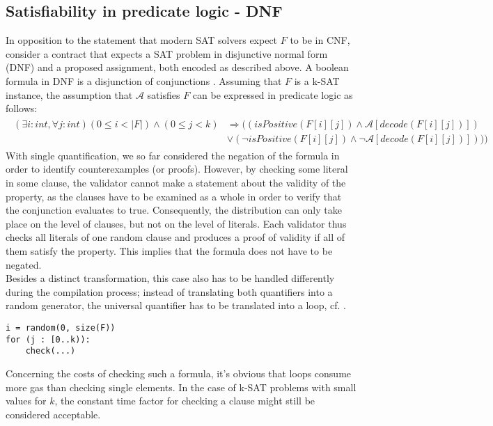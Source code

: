 \subsection{Satisfiability in predicate logic - DNF}\label{sec:dnf}
In opposition to the statement that modern SAT solvers expect $F$ to be in CNF, consider a contract that expects a SAT problem in disjunctive normal form (DNF) and a proposed assignment, both encoded as described above. A boolean formula in DNF is a disjunction of conjunctions \cite{dnf_math_encycl}. Assuming that $F$ is a k-SAT instance, the assumption that $\mathcal{A}$ satisfies $F$ can be expressed in predicate logic as follows:
\begin{gather*}\label{eq:dnf_sat}
\begin{aligned}
(\exists i : int, \forall j : int) (0 \leq i < |F|) \wedge (0 \leq j < k) &\Rightarrow ((isPositive(F[i][j]) \wedge \mathcal{A}[decode(F[i][j])]) \\
&\vee (\neg isPositive(F[i][j]) \wedge \neg \mathcal{A}[decode(F[i][j])])))
\end{aligned}
\end{gather*}
With single quantification, we so far considered the negation of the formula in order to identify counterexamples (or proofs). However, by checking some literal in some clause, the validator cannot make a statement about the validity of the property, as the clauses have to be examined as a whole in order to verify that the conjunction evaluates to true. Consequently, the distribution can only take place on the level of clauses, but not on the level of literals. Each validator thus checks all literals of one random clause and produces a proof of validity if all of them satisfy the property. This implies that the formula does not have to be negated. \\
Besides a distinct transformation, this case also has to be handled differently during the compilation process; instead of translating both quantifiers into a random generator, the universal quantifier has to be translated into a loop, cf. .
\begin{lstlisting}[label=lst:rand_loop]
i = random(0, size(F))
for (j : [0..k)):
	check(...)
\end{lstlisting}

Concerning the costs of checking such a formula, it's obvious that loops consume more gas than checking single elements. In the case of k-SAT problems with small values for $k$, the constant time factor for checking a clause might still be considered acceptable.

